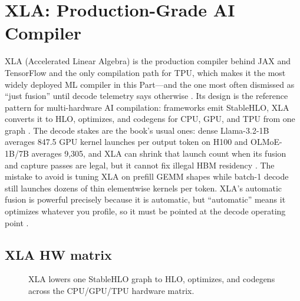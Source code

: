 \chapter{XLA: Production-Grade AI Compiler}
\label{chap:ch15}

XLA (Accelerated Linear Algebra) is the production compiler behind JAX and TensorFlow and the only compilation path for TPU, which makes it the most widely deployed ML compiler in this Part---and the one most often dismissed as ``just fusion'' until decode telemetry says otherwise \citep{openxla2024,taxbreak2026,patel2025llminference}. Its design is the reference pattern for multi-hardware AI compilation: frameworks emit StableHLO, XLA converts it to HLO, optimizes, and codegens for CPU, GPU, and TPU from one graph \citep{openxla2024,lai2023relax}. The decode stakes are the book's usual ones: dense Llama-3.2-1B averages 847.5 GPU kernel launches per output token on H100 and OLMoE-1B/7B averages 9{,}305, and XLA can shrink that launch count when its fusion and capture passes are legal, but it cannot fix illegal HBM residency \citep{taxbreak2026,memoryfloor2026,nvidia2024cudagraphs}.
The mistake to avoid is tuning XLA on prefill GEMM shapes while batch-1 decode still launches dozens of thin elementwise kernels per token. XLA's automatic fusion is powerful precisely because it is automatic, but ``automatic'' means it optimizes whatever you profile, so it must be pointed at the decode operating point \citep{kwon2023vllm,patel2025llminference}.

\section{XLA HW matrix}
\label{sec:ch15_xla_hw_matrix}


\begin{figure}[t]
\centering
{}
\caption{XLA lowers one StableHLO graph to HLO, optimizes, and codegens across the CPU/GPU/TPU hardware matrix.}
\label{fig:xla_hw_matrix_pipeline}
\end{figure}

